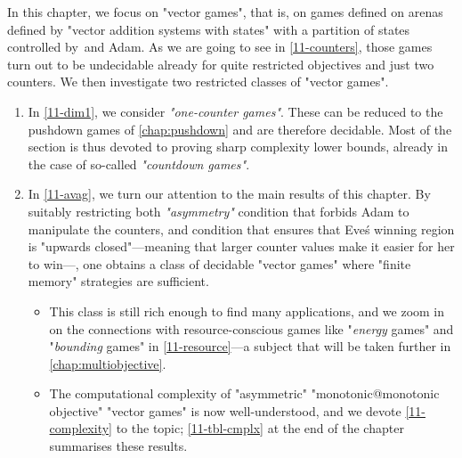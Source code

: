 In this chapter, we focus on "vector games", that is, on games defined
on arenas defined by "vector addition systems with states" with a
partition of states controlled by~\Eve and Adam.  As we are going to
see in \cref{11-counters}, those games turn out to be undecidable
already for quite restricted objectives and just two counters.  We
then investigate two restricted classes of "vector games".
\begin{enumerate}
\item In \cref{11-dim1}, we consider \emph{"one-counter games"}.  These can
  be reduced to the pushdown games of \cref{chap:pushdown} and are
  therefore decidable.  Most of the section is thus devoted to proving
  sharp complexity lower bounds, already in the case of so-called
  \emph{"countdown games"}.
\item In \cref{11-avag}, we turn our attention to the main results of
  this chapter.  By suitably restricting both
  \emph{"asymmetry"} condition that forbids Adam to manipulate the
  counters, and
    condition that ensures that Eve\'s winning region is "upwards
    closed"---meaning that larger counter values make it easier for
    her to win---,
  one obtains a class of decidable "vector games" where "finite
  memory" strategies are sufficient.
  \begin{itemize}
  \item   This class is still rich enough to find many applications, and we
  zoom in on the connections with resource-conscious games like
  "\emph{energy} games" and "\emph{bounding} games" in
  \cref{11-resource}---a subject that will be taken further in
  \cref{chap:multiobjective}.
  
  \item   The computational complexity of "asymmetric" "monotonic@monotonic
  objective" "vector games" is now well-understood, and we devote
  \cref{11-complexity} to the topic; \cref{11-tbl-cmplx} at the end of
  the chapter summarises these results.
  \end{itemize}
\end{enumerate}



